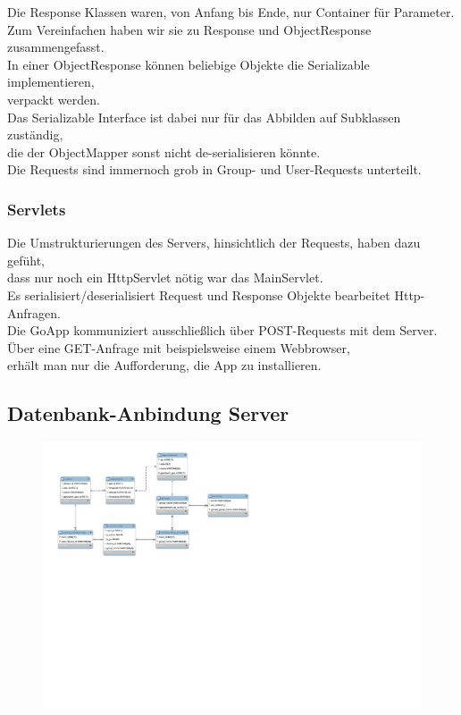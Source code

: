 Die Response Klassen waren, von Anfang bis Ende, nur Container für Parameter.\\
Zum Vereinfachen haben wir sie zu Response und ObjectResponse zusammengefasst.\\
In einer ObjectResponse können beliebige Objekte die Serializable implementieren,\\
verpackt werden.\\
Das Serializable Interface ist dabei nur für das Abbilden auf Subklassen zuständig,\\
die der ObjectMapper sonst nicht de-serialisieren könnte.\\
Die Requests sind immernoch grob in Group- und User-Requests unterteilt.\\

\subsubsection{Servlets}

Die Umstrukturierungen des Servers, hinsichtlich der Requests, haben dazu gefüht,\\
dass nur noch ein HttpServlet nötig war das MainServlet.\\
Es serialisiert/deserialisiert Request und Response Objekte bearbeitet Http-Anfragen.\\
Die GoApp kommuniziert ausschließlich über POST-Requests mit dem Server.\\
Über eine GET-Anfrage mit beispielsweise einem Webbrowser, \\
erhält man nur die Aufforderung, die App zu installieren.\\

\subsection{Datenbank-Anbindung Server}

\begin{figure}[H]
     \centering
     \hspace*{+0.2cm}\includegraphics[scale=0.7, trim=125 450 400 30]{db-server}
\end{figure}

